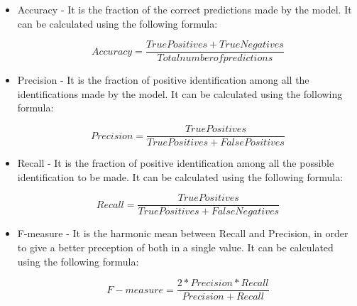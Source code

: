 \begin{itemize}
    \item Accuracy - It is the fraction of the correct predictions made by the model.
    It can be calculated using the following formula:

    \begin{equation}
    Accuracy = \frac{True Positives + True Negatives}{Total number of predictions}
    \label{eqn:Accuracy}
    \end{equation}

    \item Precision - It is the fraction of positive identification among all the identifications made by the model.
    It can be calculated using the following formula:
    
    \begin{equation}
    Precision = \frac{True Positives}{True Positives + False Positives}
    \label{eqn:Precision}
    \end{equation}

    \item Recall - It is the fraction of positive identification among all the possible identification to be made.
    It can be calculated using the following formula:
    
    \begin{equation}
    Recall = \frac{True Positives}{True Positives + False Negatives}
    \label{eqn:Recall}
    \end{equation}

    \item F-measure - It is the harmonic mean between Recall and Precision, in order to give a better preception of both in a single value.
    It can be calculated using the following formula:
    
    \begin{equation}
    F-measure = \frac{2*{Precision}*{Recall}}{Precision + Recall}
    \label{eqn:F-measure}
    \end{equation}

\end{itemize}

